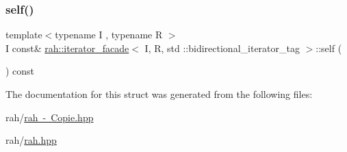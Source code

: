 \mbox{\label{structrah_1_1iterator__facade_3_01_i_00_01_r_00_01std_01_1_1bidirectional__iterator__tag_01_4_a5c701173657eb1c14b92a196ea74b498}} 
\subsubsection{\texorpdfstring{self()}{self()}\hspace{0.1cm}{\footnotesize\ttfamily [4/4]}}
{\footnotesize\ttfamily template$<$typename I , typename R $>$ \\
I const\& \mbox{\hyperlink{structrah_1_1iterator__facade}{rah\+::iterator\+\_\+facade}}$<$ I, R, std \+::bidirectional\+\_\+iterator\+\_\+tag $>$\+::self (\begin{DoxyParamCaption}{ }\end{DoxyParamCaption}) const\hspace{0.3cm}{\ttfamily [inline]}}



The documentation for this struct was generated from the following files\+:\begin{DoxyCompactItemize}
\item 
rah/\mbox{\hyperlink{rah_01-_01_copie_8hpp}{rah -\/ Copie.\+hpp}}\item 
rah/\mbox{\hyperlink{rah_8hpp}{rah.\+hpp}}\end{DoxyCompactItemize}
